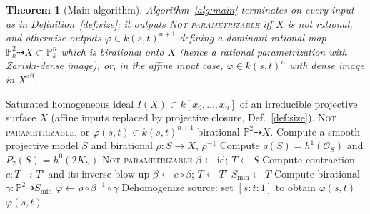 \documentclass{amsart}
\theoremstyle{plain}
\newtheorem{theorem}{Theorem}
\theoremstyle{definition}
\newcommand{\PP}{\mathbb{P}}
\newcommand{\cO}{\mathcal{O}}
\begin{document}
\begin{theorem}[Main algorithm]\label{thm:main}
Algorithm~\ref{alg:main} terminates on every input as in
Definition~\ref{def:size}; it outputs \textsc{Not parametrizable} iff $X$ is not
rational, and otherwise outputs $\varphi\in k(s,t)^{n+1}$ defining a dominant
rational map $\PP^2_k\dashrightarrow X\subset\PP^n_k$ which is birational onto
$X$ (hence a rational parametrization with Zariski-dense image), or, in the
affine input case, $\varphi\in k(s,t)^{n}$ with dense image in
$X^{\mathrm{aff}}$.
\end{theorem}

\begin{algorithm}
\caption{Rational parametrization of a surface}\label{alg:main}
\begin{algorithmic}[1]
\Require Saturated homogeneous ideal $I(X)\subset k[x_0,\dots,x_n]$ of an
irreducible projective surface $X$ (affine inputs replaced by projective closure,
Def.~\ref{def:size}).
\Ensure \textsc{Not parametrizable}, or $\varphi(s,t)\in k(s,t)^{n+1}$ birational
$\PP^2\dashrightarrow X$.
\State Compute a smooth projective model $S$ and birational $\rho\colon S\to X$,
$\rho^{-1}$ 
\State Compute $q(S)=h^1(\cO_S)$ and $P_2(S)=h^0(2K_S)$ 
  \State \Return \textsc{Not parametrizable} 
\EndIf
\State $\beta\gets\mathrm{id}$; $T\gets S$
 
  \State Compute contraction $c\colon T\to T'$ and its inverse blow-up
  \State $\beta\gets c\circ\beta$; $T\gets T'$
\EndWhile
\State $S_{\min}\gets T$ \Comment{minimal; $\PP^2$ or $\mathbb F_e$}
\State Compute birational $\gamma\colon\PP^2\dashrightarrow S_{\min}$
\State $\varphi\gets\rho\circ\beta^{-1}\circ\gamma$ 
\State Dehomogenize source: set $[s:t:1]$ to obtain $\varphi(s,t)$
\State \Return $\varphi(s,t)$
\end{algorithmic}
\end{algorithm}
\end{document}
